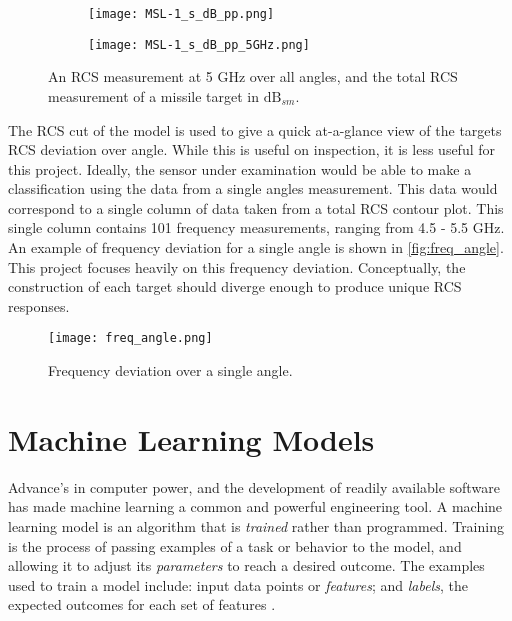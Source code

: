	\begin{figure}[htbp]
	  \centering
	  \begin{subfigure}{.5\textwidth}
	    \centering
	    \texttt{[image: MSL-1\_s\_dB\_pp.png]}
	  \end{subfigure}%
	  \begin{subfigure}{.5\textwidth}
	    \centering
	    \texttt{[image: MSL-1\_s\_dB\_pp\_5GHz.png]}
	  \end{subfigure}
	  \caption[Missile RCS data sample (Total)]{An RCS measurement at 5 GHz over all angles, and the total RCS measurement of a missile target in $\textrm{dB}_{sm}$.}
	  \label{fig:msl_db}
	\end{figure}

	The RCS cut of the model is used to give a quick at-a-glance view of the targets RCS deviation over angle. While this is useful on inspection, it is less useful for this project. Ideally, the sensor under examination would be able to make a classification using the data from a single angles measurement. This data would correspond to a single column of data taken from a total RCS contour plot. This single column contains 101 frequency measurements, ranging from 4.5 - 5.5 GHz. An example of frequency deviation for a single angle is shown in \ref{fig:freq_angle}. This project focuses heavily on this frequency deviation. Conceptually, the construction of each target should diverge enough to produce unique RCS responses.

	\begin{figure}[htbp]
	  \centering
	   \texttt{[image: freq\_angle.png]}
	  \caption[Missile RCS data, Angle Slice]{Frequency deviation over a single angle.}
	  \label{fig:frq_ang}
	\end{figure}

\section{Machine Learning Models}

	Advance's in computer power, and the development of readily available software has made machine learning a common and powerful engineering tool. A machine learning model is an algorithm that is \textit{trained} rather than programmed. Training is the process of passing examples of a task or behavior to the model, and allowing it to adjust its \textit{parameters} to reach a desired outcome. The examples used to train a model include:  input data points or \textit{features}; and \textit{labels}, the expected outcomes for each set of features \cite{Chollet}.

